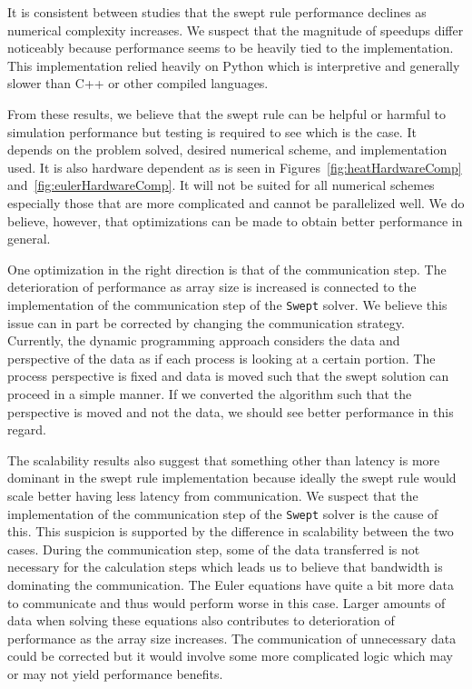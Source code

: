 \documentclass[preprints,article,accept,moreauthors,pdftex]{Definitions/mdpi}
\def\Swept{\texttt{Swept}}
\begin{document}
It is consistent between studies that the swept rule performance declines as numerical complexity increases. We suspect that the magnitude of speedups differ noticeably because performance seems to be heavily tied to the implementation. This implementation relied heavily on Python which is interpretive and generally slower than C++ or other compiled languages.  

From these results, we believe that the swept rule can be helpful or harmful to simulation performance but testing is required to see which is the case. It depends on the problem solved, desired numerical scheme, and implementation used. It is also hardware dependent as is seen in Figures~\ref{fig:heatHardwareComp} and~\ref{fig:eulerHardwareComp}. It will not be suited for all numerical schemes especially those that are more complicated and cannot be parallelized well. We do believe, however, that optimizations can be made to obtain better performance in general. 

One optimization in the right direction is that of the communication step. The deterioration of performance as array size is increased is connected to the implementation of the communication step of the \Swept{} solver. We believe this issue can in part be corrected by changing the communication strategy. Currently, the dynamic programming approach considers the data and perspective of the data as if each process is looking at a certain portion. The process perspective is fixed and data is moved such that the swept solution can proceed in a simple manner. If we converted the algorithm such that the perspective is moved and not the data, we should see better performance in this regard.

The scalability results also suggest that something other than latency is more dominant in the swept rule implementation because ideally the swept rule would scale better having less latency from communication. We suspect that the implementation of the communication step of the \Swept{} solver is the cause of this. This suspicion is supported by the difference in scalability between the two cases. During the communication step, some of the data transferred is not necessary for the calculation steps which leads us to believe that bandwidth is dominating the communication. The Euler equations have quite a bit more data to communicate and thus would perform worse in this case. Larger amounts of data when solving these equations also contributes to deterioration of performance as the array size increases. The communication of unnecessary data could be corrected but it would involve some more complicated logic which may or may not yield performance benefits.
\end{document}
